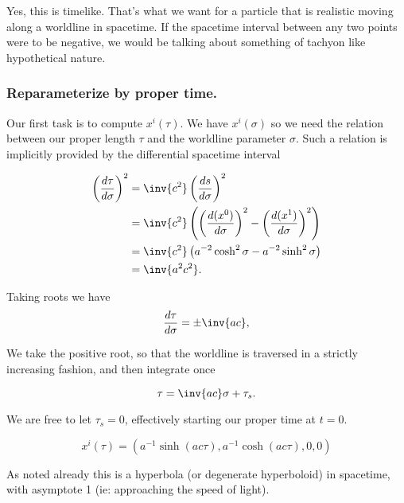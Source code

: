 Yes, this is timelike.  That's what we want for a particle that is realistic moving along a worldline in spacetime.  If the spacetime interval between any two points were to be negative, we would be talking about something of tachyon like hypothetical nature.

\subsubsection{Reparameterize by proper time.}

Our first task is to compute $x^i(\tau)$.  We have $x^i(\sigma)$ so we need the relation between our proper length $\tau$ and the worldline parameter $\sigma$.  Such a relation is implicitly provided by the differential spacetime interval

\begin{align*}
\left(\frac{d\tau}{d\sigma}\right)^2
&= \inv{c^2} \left(\frac{ds}{d\sigma}\right)^2 \\
&= \inv{c^2} \left(
\left( \frac{d(x^0)}{d\sigma}\right)^2
-\left( \frac{d(x^1)}{d\sigma}\right)^2
\right) \\
&= \inv{c^2} \left( a^{-2} \cosh^2 \sigma - a^{-2} \sinh^2 \sigma \right) \\
&= \inv{a^2 c^2}.
\end{align*}

Taking roots we have
\begin{equation}\label{eqn:relativisticElectrodynamicsT2:50}
\frac{d\tau}{d\sigma} = \pm \inv{a c},
\end{equation}

We take the positive root, so that the worldline is traversed in a strictly increasing fashion, and then integrate once

\begin{equation}\label{eqn:relativisticElectrodynamicsT2:60}
\tau = \inv{ac} \sigma + \tau_s.
\end{equation}

We are free to let $\tau_s = 0$, effectively starting our proper time at $t=0$.

\begin{equation}\label{eqn:relativisticElectrodynamicsT2:70}
x^i(\tau) = ( a^{-1} \sinh( a c \tau), a^{-1} \cosh( a c \tau ), 0, 0 )
\end{equation}

As noted already this is a hyperbola (or degenerate hyperboloid) in spacetime, with asymptote 1 (ie: approaching the speed of light).


